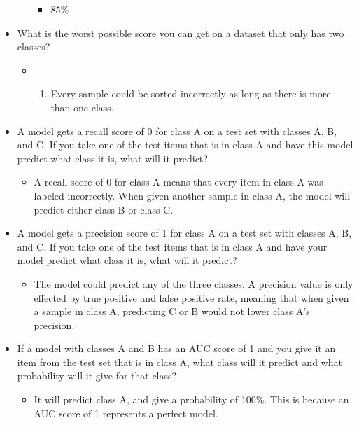 \documentclass[letterpaper]{article}
\begin{document}
\begin{itemize}
\begin{itemize}
\begin{itemize}
\item 85\%
\end{itemize}
\end{itemize}

\item What is the worst possible score you can get on a dataset that only
has two classes?

\begin{itemize}
\item \begin{enumerate}
\item Every sample could be sorted incorrectly as long as there is more
than one class.
\end{enumerate}
\end{itemize}

\item A model gets a recall score of 0 for class A on a test set with
classes A, B, and C. If you take one of the test items that is in
class A and have this model predict what class it is, what will it
predict?

\begin{itemize}
\item A recall score of 0 for class A means that every item in class A was
labeled incorrectly. When given another sample in class A, the model
will predict either class B or class C.
\end{itemize}

\item A model gets a precision score of 1 for class A on a test set with
classes A, B, and C. If you take one of the test items that is in
class A and have your model predict what class it is, what will it
predict?

\begin{itemize}
\item The model could predict any of the three classes. A precision value
is only effected by true positive and false positive rate, meaning
that when given a sample in class A, predicting C or B would not
lower class A's precision.
\end{itemize}

\item If a model with classes A and B has an AUC score of 1 and you give it
an item from the test set that is in class A, what class will it
predict and what probability will it give for that class?

\begin{itemize}
\item It will predict class A, and give a probability of 100\%. This is
because an AUC score of 1 represents a perfect model.
\end{itemize}


\end{itemize}
\end{document}
